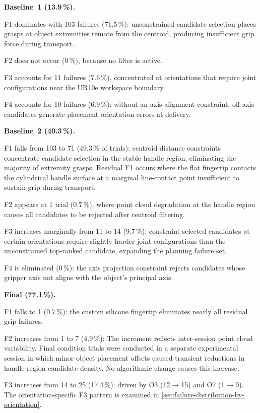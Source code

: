 \documentclass[12pt, a4paper]{report}
\begin{document}
\textbf{Baseline~1 (13.9\,\%).}

F1 dominates with 103 failures (71.5\,\%): unconstrained candidate selection places grasps at object extremities remote from the centroid, producing insufficient grip force during transport.

F2 does not occur (0\,\%), because no filter is active.

F3 accounts for 11 failures (7.6\,\%), concentrated at orientations that require joint configurations near the UR10e workspace boundary.

F4 accounts for 10 failures (6.9\,\%): without an axis alignment constraint, off-axis candidates generate placement orientation errors at delivery.

\textbf{Baseline~2 (40.3\,\%).}

F1 falls from 103 to 71 (49.3\,\% of trials): centroid distance constraints concentrate candidate selection in the stable handle region, eliminating the majority of extremity grasps. Residual F1 occurs where the flat fingertip contacts the cylindrical handle surface at a marginal line-contact point insufficient to sustain grip during transport.

F2 appears at 1 trial (0.7\,\%), where point cloud degradation at the handle region causes all candidates to be rejected after centroid filtering.

F3 increases marginally from 11 to 14 (9.7\,\%): constraint-selected candidates at certain orientations require slightly harder joint configurations than the unconstrained top-ranked candidate, expanding the planning failure set.

F4 is eliminated (0\,\%): the axis projection constraint rejects candidates whose gripper axis not aligns with the object's principal axis.

\textbf{Final (77.1\,\%).}

F1 falls to 1 (0.7\,\%): the custom silicone fingertip eliminates nearly all residual grip failures. 

F2 increases from 1 to 7 (4.9\,\%): The increment reflects inter-session point cloud variability. Final condition trials were conducted in a separate experimental session in which minor object placement offsets caused transient reductions in handle-region candidate density. No algorithmic change causes this increase.

F3 increases from 14 to 25 (17.4\,\%): driven by O3 (12$\rightarrow$15) and O7 (1$\rightarrow$9). The orientation-specific F3 pattern is examined in \cref{sec:failure-distribution-by-orientation}.
\end{document}

